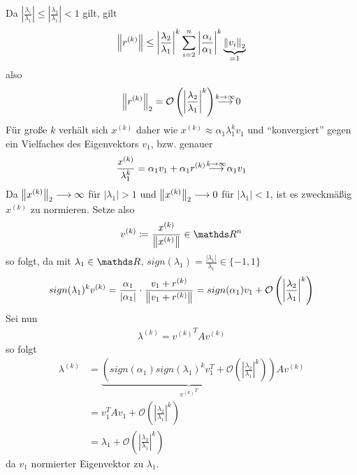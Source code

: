 Da $\left|\frac{\lambda_i}{\lambda_1}\right|
\leq \left|\frac{\lambda_2}{\lambda_1}\right|<1$
gilt, gilt
\begin{gather*}
  \left\| r^{(k)} \right\| \leq \left|\frac{\lambda_2}{\lambda_1}\right|^k
  \sum_{i=2}^n \left|\frac{\alpha_i}{\alpha_1}\right|^k
    \underbrace{\left\| v_i \right\|_2}_{=1}
\end{gather*}
also 
\begin{gather*}
  \nn{r^{(k)}}_2=\mathcal{O}\left(
    \left|\frac{\lambda_2}{\lambda_1}\right|^k 
  \right)
\overset{\mathclap{k\rightarrow \infty}}{\longrightarrow} 0
\end{gather*}
Für große $k$ verhält sich $x^{(k)}$ daher wie 
$ x^{(k)}\approx \alpha_1\lambda_1^kv_1$
und \enquote{konvergiert} gegen ein Vielfaches des Eigenvektors $v_1$,
bzw. genauer
\begin{gather*}
  \frac{x^{(k)}}{\lambda_1^k}= \alpha_1v_1+\alpha_1r^{(k)}
  \overset{\mathclap{k\rightarrow \infty}}{\longrightarrow}
  \alpha_1v_1
\end{gather*}
Da $\left\| x^{(k)} \right\|_2\longrightarrow\infty$ für $|\lambda_1|>1$
und $\left\| x^{(k)} \right\|_2\longrightarrow 0$ für $|\lambda_1|<1$,
ist es zweckmäßig $x^{(k)}$ zu normieren.
Setze also
\begin{gather}
  v^{(k)} \coloneqq \frac{x^{(k)}}{ \nn{x^{(k)}} } \in \R^n
\label{VIII.2.3}
\end{gather}
so folgt, da mit $\lambda_1\in \R$,
 $sign(\lambda_1)=\frac{|\lambda_1|}{\lambda_1}\in\{-1,1\}$
 \begin{gather}
   sign(\lambda_1)^k v^{(k)} = \frac{\alpha_1}{|\alpha_1|}
   \cdot \frac{v_1+r^{(k)}}{\left\| v_1+r^{(k)} \right\|}
 = sign(\alpha_1)v_1 + \mathcal{O}\left(\left| 
     \frac{\lambda_2}{\lambda_1}
     \right|^k\right)
   \label{VIII.2.4}
 \end{gather}
Sei nun
\begin{gather}
  \lambda^{(k)} = {v^{(k)}}^TAv^{(k)}
  \label{VIII.2.5}
\end{gather}
so folgt 
\begin{align*}
  \lambda^{(k)} &= \underbrace{ \left(
                 sign(\alpha_1)sign(\lambda_1)^kv_1^T
                 +\mathcal{O}\left( \left| \frac{\lambda_2}{\lambda_1} 
                 \right|^k \right)\right)
                 }_{
                 {v^{(k)}}^T
                 } Av^{(k)} \\
               &=v_1^T A v_1 + \mathcal{O}\left( \left|
                 \frac{\lambda_2}{\lambda_1} 
                 \right|^k \right) \\
               &= \lambda_1 + \mathcal{O}\left( 
                 \left| \frac{\lambda_2}{\lambda_1} 
                 \right|^k \right)
\end{align*}
da $v_1$ normierter Eigenvektor zu $\lambda_1$.

